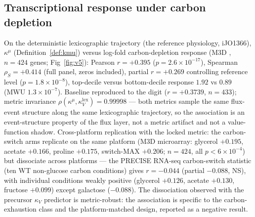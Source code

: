 \documentclass[11pt,a4paper]{article}
\theoremstyle{plain}
\theoremstyle{definition}
\theoremstyle{remark}
\newcommand{\kk}{\kappa_{\!V}}
\newcommand{\kmu}{\kappa^{\mu}}
\begin{document}
\subsection{Transcriptional response under carbon depletion}
\label{sec:v5}
On the deterministic lexicographic trajectory (the reference physiology, iJO1366),
$\kmu$ (Definition~\ref{def:kmu}) versus log-fold carbon-depletion
response (M3D \citep{faith2008}, $n = 424$ genes;
Fig~\ref{fig:v5}):
Pearson $r = +0.395$ ($p = 2.6 \times 10^{-17}$), Spearman
$\rho_S = +0.414$ (full panel, zeros included), partial $r = +0.269$
controlling reference level
($p = 1.8 \times 10^{-8}$), top-decile versus bottom-decile response
$1.92$ vs $0.89$ (MWU $1.3 \times 10^{-7}$). Baseline reproduced to the
digit ($r = +0.3739$, $n = 433$); metric invariance
$\rho(\kmu, \kk^{\mathrm{lex}}) = 0.99998$ --- both metrics sample the
same flux-event structure along the same lexicographic trajectory, so
the association is an event-structure property of the flux layer, not a
metric artifact and not a value-function shadow. Cross-platform
replication with the locked metric: the carbon-switch arms replicate
on the same platform (M3D microarray: glycerol $+0.195$, acetate
$+0.166$, proline $+0.175$, switch-MAX $+0.206$; $n = 424$, all
$p < 6 \times 10^{-4}$) but dissociate across platforms --- the
PRECISE RNA-seq carbon-switch statistic (ten WT non-glucose carbon
conditions) gives $r = -0.044$ (partial $-0.088$, NS), with
individual conditions weakly positive (glycerol $+0.126$, acetate
$+0.130$, fructose $+0.099$) except galactose ($-0.088$). The dissociation observed with the precursor $\kk$ predictor is metric-robust: the association is specific to the
carbon-exhaustion class and the platform-matched design, reported as a negative result.
\end{document}
